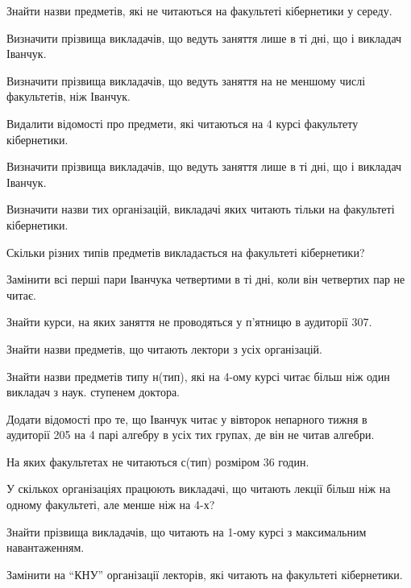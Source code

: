 \begin{card}
    \item Знайти назви предметів, які не читаються на факультеті кібернетики у середу.
    \item Визначити прізвища викладачів, що ведуть заняття лише в ті дні, що і викладач Іванчук.
    \item Визначити прізвища викладачів, що ведуть заняття на не меншому числі факультетів, ніж Іванчук.
    \item Видалити відомості про предмети, які читаються на 4 курсі факультету кібернетики.
\end{card}

\begin{card}
    \item Визначити прізвища викладачів, що ведуть заняття лише в ті дні, що і викладач Іванчук.
    \item Визначити назви тих організацій, викладачі яких читають тільки на факультеті кібернетики.
    \item Скільки різних типів предметів викладається на факультеті кібернетики?
    \item Замінити всі перші пари Іванчука четвертими в ті дні, коли він четвертих пар не читає.
\end{card}

\begin{card}
    \item Знайти курси, на яких заняття не проводяться у п'ятницю в аудиторії 307.
    \item Знайти назви предметів, що читають лектори з усіх організацій.
    \item Знайти назви предметів типу н (тип), які на 4-ому курсі читає більш ніж один викладач з наук. ступенем доктора.
    \item Додати відомості про те, що Іванчук читає у вівторок непарного тижня в аудиторії 205 на 4 парі алгебру в усіх тих групах, де він не читав алгебри.
\end{card}

\begin{card}
    \item На яких факультетах не читаються с (тип) розміром 36 годин.
    \item У скількох організаціях працюють викладачі, що читають лекції більш ніж на одному факультеті, але менше ніж на 4-х?
    \item Знайти прізвища викладачів, що читають на 1-ому курсі з максимальним навантаженням.
    \item Замінити на ``КНУ'' організації лекторів, які читають на факультеті кібернетики.
\end{card}

